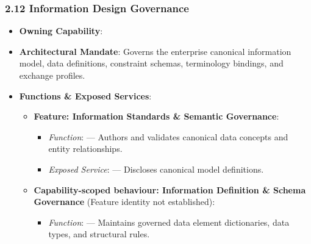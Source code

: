 \par\smallskip
{}\label{rad:ise:226}
\subsubsection*{2.12 Information Design Governance}
\label{rad:ise:227}

\begin{itemize}

\item 
\textbf{Owning Capability}: \texttt{}



\item 
\textbf{Architectural Mandate}: Governs the enterprise canonical information model, data definitions, constraint schemas, terminology bindings, and exchange profiles.



\item 
\textbf{Functions \& Exposed Services}:


\begin{itemize}

\item 
\textbf{Feature: Information Standards \& Semantic Governance}:


\begin{itemize}

\item 
\emph{Function}: \texttt{} — Authors and validates canonical data concepts and entity relationships.



\item 
\emph{Exposed Service}: \texttt{} — Discloses canonical model definitions.



\end{itemize}


\item 
\textbf{Capability-scoped behaviour: Information Definition \& Schema Governance} (Feature identity not established):


\begin{itemize}

\item 
\emph{Function}: \texttt{} — Maintains governed data element dictionaries, data types, and structural rules.




\end{itemize}
\end{itemize}
\end{itemize}
